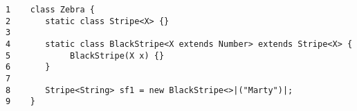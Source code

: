 \documentclass{article}
\begin{document}


\begin{lstlisting}[style=JavaSource]
1    class Zebra {
2       static class Stripe<X> {}
3
4       static class BlackStripe<X extends Number> extends Stripe<X> {
5            BlackStripe(X x) {}
6       }
7
8       Stripe<String> sf1 = new BlackStripe<>|("Marty")|;
9    }
\end{lstlisting}
\end{document}

